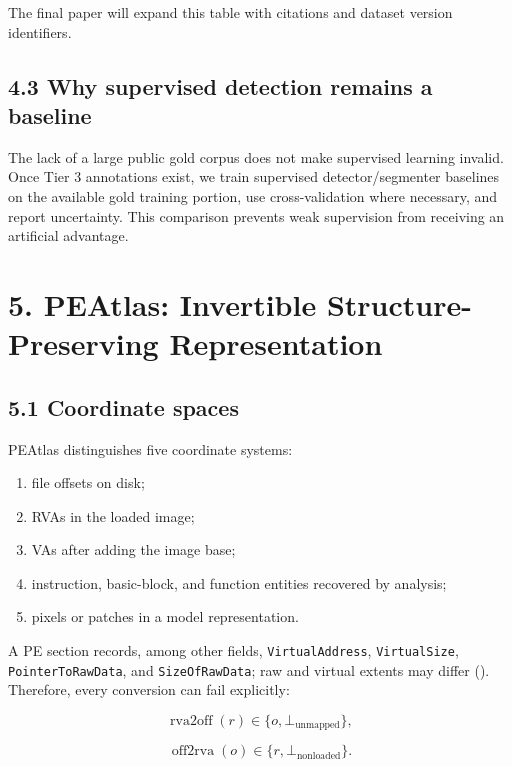 \documentclass[
  10pt,
]{article}
\providecommand{\tightlist}{%
  \setlength{\itemsep}{0pt}\setlength{\parskip}{0pt}}
\begin{document}
The final paper will expand this table with citations and dataset
version identifiers.

\subsection{4.3 Why supervised detection remains a
baseline}\label{why-supervised-detection-remains-a-baseline}

The lack of a large public gold corpus does not make supervised learning
invalid. Once Tier 3 annotations exist, we train supervised
detector/segmenter baselines on the available gold training portion, use
cross-validation where necessary, and report uncertainty. This
comparison prevents weak supervision from receiving an artificial
advantage.

\section{5. PEAtlas: Invertible Structure-Preserving
Representation}\label{peatlas-invertible-structure-preserving-representation}

\subsection{5.1 Coordinate spaces}\label{coordinate-spaces}

PEAtlas distinguishes five coordinate systems:

\begin{enumerate}
\def\labelenumi{\arabic{enumi}.}
\tightlist
\item
  file offsets on disk;
\item
  RVAs in the loaded image;
\item
  VAs after adding the image base;
\item
  instruction, basic-block, and function entities recovered by analysis;
\item
  pixels or patches in a model representation.
\end{enumerate}

A PE section records, among other fields, \texttt{VirtualAddress},
\texttt{VirtualSize}, \texttt{PointerToRawData}, and
\texttt{SizeOfRawData}; raw and virtual extents may differ
(). Therefore, every
conversion can fail explicitly:

\[
\operatorname{rva2off}(r) \in \{o, \bot_{\text{unmapped}}\},
\]

\[
\operatorname{off2rva}(o) \in \{r, \bot_{\text{nonloaded}}\}.
\]
\end{document}
